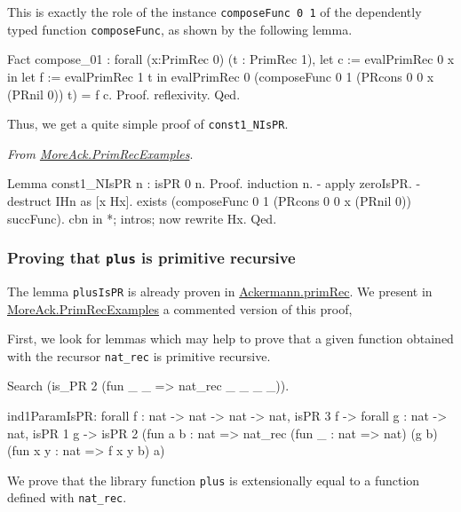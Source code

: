 This is exactly the role of the instance \texttt{composeFunc 0 1} of the dependently typed
function \texttt{composeFunc}, as shown by the following lemma.

\begin{Coqsrc}
Fact compose_01 :
    forall (x:PrimRec 0) (t : PrimRec 1),
    let c := evalPrimRec 0 x in
    let f := evalPrimRec 1 t in
    evalPrimRec 0 (composeFunc 0 1
                               (PRcons 0 0 x (PRnil 0))
                               t)  =
     f c.
Proof. reflexivity. Qed.
\end{Coqsrc}

Thus, we get a quite simple proof of \texttt{const1\_NIsPR}.


\vspace{4pt}
\noindent
\emph{From \href{../theories/html/hydras.MoreAck.PrimRecExamples.html}{MoreAck.PrimRecExamples}}.
\begin{Coqsrc}
Lemma  const1_NIsPR n : isPR 0 n. 
Proof.
  induction n.
  - apply zeroIsPR.
  - destruct IHn as [x Hx].
   exists (composeFunc 0 1 (PRcons 0 0 x (PRnil 0)) succFunc). 
   cbn in *; intros; now rewrite Hx.
Qed.
\end{Coqsrc}


\subsubsection{Proving that \texttt{plus} is primitive recursive}

The lemma \texttt{plusIsPR} is already proven in \href{../theories/html/hydras.primRec.html}{Ackermann.primRec}. We present in 
\href{../theories/html/hydras.MoreAck.PrimRecExamples.html}{MoreAck.PrimRecExamples}
a commented version of this proof, 

First, we look for lemmas which may help to prove that a given function obtained with the recursor \texttt{nat\_rec} is primitive recursive.

\begin{Coqsrc}
Search (is_PR 2 (fun _ _ => nat_rec _ _ _ _)).
\end{Coqsrc}

\begin{Coqanswer}
ind1ParamIsPR:
  forall f : nat -> nat -> nat -> nat,
  isPR 3 f ->
  forall g : nat -> nat,
  isPR 1 g ->
  isPR 2
    (fun a b : nat =>
     nat_rec (fun _ : nat => nat)
                 (g b) (fun x y : nat => f x y b) a)
\end{Coqanswer}

We prove that the library function \texttt{plus} is extensionally equal to a function defined with
\texttt{nat\_rec}.


